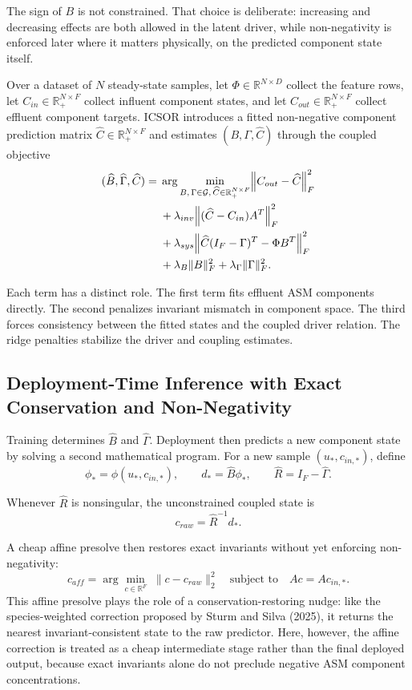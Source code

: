 \documentclass[11pt]{article}
\begin{document}
The sign of $B$ is not constrained. That choice is deliberate: increasing and decreasing effects are both allowed in the latent driver, while non-negativity is enforced later where it matters physically, on the predicted component state itself.

Over a dataset of $N$ steady-state samples, let $\Phi \in \mathbb{R}^{N \times D}$ collect the feature rows, let $C_{in} \in \mathbb{R}_{+}^{N \times F}$ collect influent component states, and let $C_{out} \in \mathbb{R}_{+}^{N \times F}$ collect effluent component targets. ICSOR introduces a fitted non-negative component prediction matrix $\widehat{C} \in \mathbb{R}_{+}^{N \times F}$ and estimates $(B, \Gamma, \widehat{C})$ through the coupled objective
\[
\begin{aligned}
(\widehat{B}, \widehat{\Gamma}, \widehat{C}) = {}&
\arg\min_{B,\, \Gamma \in \mathcal{G},\, \widehat{C} \in \mathbb{R}_{+}^{N \times F}}
\Bigl\|
C_{out} - \widehat{C}
\Bigr\|_F^2 \\
&+ \lambda_{inv}
\Bigl\|
(\widehat{C} - C_{in})A^T
\Bigr\|_F^2 \\
&+ \lambda_{sys}
\Bigl\|
\widehat{C}(I_F - \Gamma)^T - \Phi B^T
\Bigr\|_F^2 \\
&+ \lambda_B \|B\|_F^2
+ \lambda_\Gamma \|\Gamma\|_F^2.
\end{aligned}
\]

Each term has a distinct role. The first term fits effluent ASM components directly. The second penalizes invariant mismatch in component space. The third forces consistency between the fitted states and the coupled driver relation. The ridge penalties stabilize the driver and coupling estimates.

\subsection{Deployment-Time Inference with Exact Conservation and Non-Negativity}

Training determines $\widehat{B}$ and $\widehat{\Gamma}$. Deployment then predicts a new component state by solving a second mathematical program. For a new sample $(u_*, c_{in,*})$, define
\[
\phi_* = \phi(u_*, c_{in,*}), \qquad d_* = \widehat{B}\phi_*, \qquad \widehat{R} = I_F - \widehat{\Gamma}.
\]

Whenever $\widehat{R}$ is nonsingular, the unconstrained coupled state is
\[
 c_{raw} = \widehat{R}^{-1} d_*.
\]

A cheap affine presolve then restores exact invariants without yet enforcing non-negativity:
\[
 c_{aff} = \arg\min_{c \in \mathbb{R}^{F}} \; \|c - c_{raw}\|_2^2 \quad \text{subject to} \quad A c = A c_{in,*}.
\]
This affine presolve plays the role of a conservation-restoring nudge: like the species-weighted correction proposed by Sturm and Silva (2025), it returns the nearest invariant-consistent state to the raw predictor. Here, however, the affine correction is treated as a cheap intermediate stage rather than the final deployed output, because exact invariants alone do not preclude negative ASM component concentrations.
\end{document}
